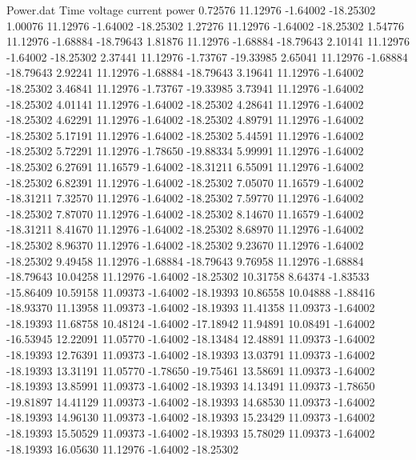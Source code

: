 \begin{filecontents}{Power.dat}
Time voltage current power
   0.72576   11.12976   -1.64002  -18.25302
   1.00076   11.12976   -1.64002  -18.25302
   1.27276   11.12976   -1.64002  -18.25302
   1.54776   11.12976   -1.68884  -18.79643
   1.81876   11.12976   -1.68884  -18.79643
   2.10141   11.12976   -1.64002  -18.25302
   2.37441   11.12976   -1.73767  -19.33985
   2.65041   11.12976   -1.68884  -18.79643
   2.92241   11.12976   -1.68884  -18.79643
   3.19641   11.12976   -1.64002  -18.25302
   3.46841   11.12976   -1.73767  -19.33985
   3.73941   11.12976   -1.64002  -18.25302
   4.01141   11.12976   -1.64002  -18.25302
   4.28641   11.12976   -1.64002  -18.25302
   4.62291   11.12976   -1.64002  -18.25302
   4.89791   11.12976   -1.64002  -18.25302
   5.17191   11.12976   -1.64002  -18.25302
   5.44591   11.12976   -1.64002  -18.25302
   5.72291   11.12976   -1.78650  -19.88334
   5.99991   11.12976   -1.64002  -18.25302
   6.27691   11.16579   -1.64002  -18.31211
   6.55091   11.12976   -1.64002  -18.25302
   6.82391   11.12976   -1.64002  -18.25302
   7.05070   11.16579   -1.64002  -18.31211
   7.32570   11.12976   -1.64002  -18.25302
   7.59770   11.12976   -1.64002  -18.25302
   7.87070   11.12976   -1.64002  -18.25302
   8.14670   11.16579   -1.64002  -18.31211
   8.41670   11.12976   -1.64002  -18.25302
   8.68970   11.12976   -1.64002  -18.25302
   8.96370   11.12976   -1.64002  -18.25302
   9.23670   11.12976   -1.64002  -18.25302
   9.49458   11.12976   -1.68884  -18.79643
   9.76958   11.12976   -1.68884  -18.79643
  10.04258   11.12976   -1.64002  -18.25302
  10.31758    8.64374   -1.83533  -15.86409
  10.59158   11.09373   -1.64002  -18.19393
  10.86558   10.04888   -1.88416  -18.93370
  11.13958   11.09373   -1.64002  -18.19393
  11.41358   11.09373   -1.64002  -18.19393
  11.68758   10.48124   -1.64002  -17.18942
  11.94891   10.08491   -1.64002  -16.53945
  12.22091   11.05770   -1.64002  -18.13484
  12.48891   11.09373   -1.64002  -18.19393
  12.76391   11.09373   -1.64002  -18.19393
  13.03791   11.09373   -1.64002  -18.19393
  13.31191   11.05770   -1.78650  -19.75461
  13.58691   11.09373   -1.64002  -18.19393
  13.85991   11.09373   -1.64002  -18.19393
  14.13491   11.09373   -1.78650  -19.81897
  14.41129   11.09373   -1.64002  -18.19393
  14.68530   11.09373   -1.64002  -18.19393
  14.96130   11.09373   -1.64002  -18.19393
  15.23429   11.09373   -1.64002  -18.19393
  15.50529   11.09373   -1.64002  -18.19393
  15.78029   11.09373   -1.64002  -18.19393
  16.05630   11.12976   -1.64002  -18.25302

\end{filecontents}

